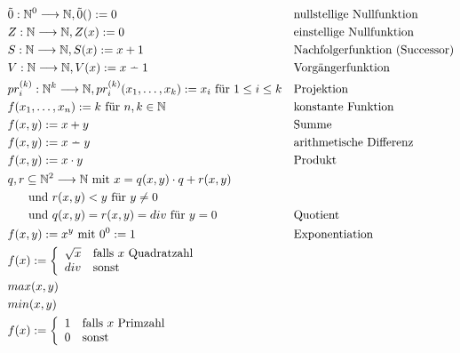 \documentclass[10pt,oneside,a4paper]{scrartcl}
\newcommand{\dotminus}{\stackrel{\cdot}{\relbar}}
\begin{document}
    \begin{align}
    &\tilde{0} : \mathbb{N}^0\longrightarrow \mathbb{N}, \tilde{0}() := 0
        && \text{nullstellige Nullfunktion}\\
    &Z : \mathbb{N}\longrightarrow \mathbb{N}, Z(x) := 0
        && \text{einstellige Nullfunktion}\\
    &S : \mathbb{N}\longrightarrow \mathbb{N}, S(x) := x+1
        && \text{Nachfolgerfunktion (Successor)}\\
    &V : \mathbb{N}\longrightarrow \mathbb{N}, V(x) := x \dotminus 1
        && \text{Vorgängerfunktion}\\
    &pr_i^{(k)} : \mathbb{N}^k\longrightarrow \mathbb{N},
        pr_i^{(k)}(x_1, \ldots, x_k) := x_i \text{ für $1\leq i\leq k$}
        && \text{Projektion}\\
    &f(x_1, \ldots, x_n) := k \text{ für } n, k \in \mathbb{N}
        && \text{konstante Funktion}\\
    &f(x, y) := x+y && \text{Summe}\\
    &f(x, y) := x \dotminus y && \text{arithmetische Differenz}\\
    &f(x, y) := x \cdot y && \text{Produkt}\\
    &q,r \subseteq\mathbb{N}^2\longrightarrow \mathbb{N}
        \text{ mit } x = q(x, y)\cdot q+r(x, y)\nonumber\\
        &\hspace{5mm}\text{ und } r(x, y) < y \text{ für } y \neq 0\nonumber\\
        &\hspace{5mm}\text{ und } q(x, y) = r(x, y) = div \text{ für } y = 0
        && \text{Quotient}\\
    &f(x, y) := x^y \text{ mit } 0^0 := 1 && \text{Exponentiation}\\
    &f(x) := \left\{
        \begin{array}{ll}
        \sqrt{x} & \text{falls $x$ Quadratzahl}\\
        div & \text{sonst}
        \end{array}\right.\\
    &max(x, y)\\
    &min(x, y)\\
    &f(x) := \left\{
        \begin{array}{ll}
        1 & \text{falls $x$ Primzahl}\\
        0 & \text{sonst}
        \end{array}\right.\\

\end{align}
\end{document}
